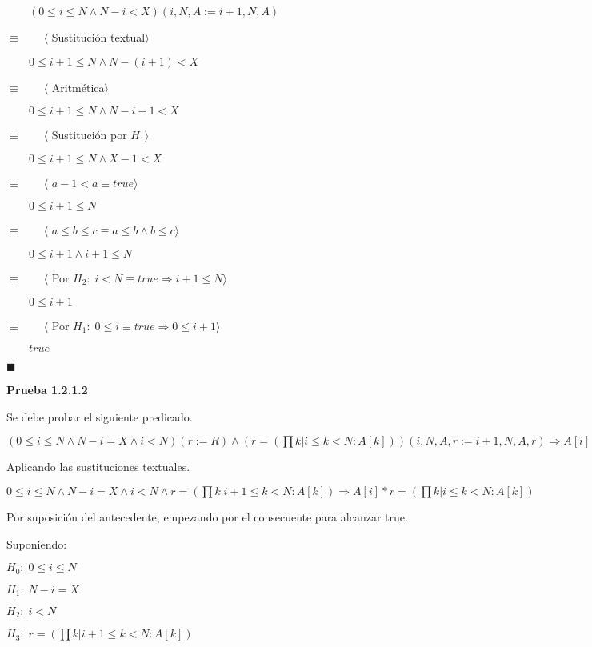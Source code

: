 \documentclass[hidelinks]{article}
\begin{document}
\begin{itemize}
	      $\qquad (0 \leq i \leq N \land N - i < X)(i,N, A := i + 1,N,A)$\par
	      $\equiv \qquad \langle$ Sustitución textual$\rangle$\par
	      $\qquad 0 \leq i + 1 \leq N \land N - (i + 1) < X$\par
	      $\equiv \qquad \langle$ Aritmética$\rangle$\par
	      $\qquad 0 \leq i + 1 \leq N \land N - i - 1 < X$\par
	      $\equiv \qquad \langle$ Sustitución por $H_1\rangle$\par
	      $\qquad 0 \leq i + 1 \leq N \land X - 1 < X$\par
	      $\equiv \qquad \langle$ $a - 1 < a \equiv true\rangle$\par
	      $\qquad 0 \leq i + 1 \leq N$\par
	      $\equiv \qquad \langle$ $a \leq b \leq c \equiv a \leq b \land b \leq c\rangle$\par
	      $\qquad 0 \leq i + 1 \land i + 1 \leq N$\par
	      $\equiv \qquad \langle$ Por $H_2: \; i < N \equiv true \Rightarrow i + 1 \leq N \rangle$\par
	      $\qquad 0 \leq i + 1$\par
	      $\equiv \qquad \langle$ Por $H_1: \; 0 \leq i \equiv true \Rightarrow 0 \leq i + 1 \rangle$\par
	      $\qquad true$\par
	      $\blacksquare$\par

	      \textbf{Prueba 1.2.1.2}\par
	      Se debe probar el siguiente predicado.\par
	      $(0 \leq i \leq N \land N - i = X \land i < N)(r := R) \land (r = (\prod k | i \leq k < N: A[k]))(i,N,A,r := i + 1, N,A,r) \Rightarrow A[i]*r = (\prod k | i \leq k < N: A[k])$\par
	      Aplicando las sustituciones textuales.\par
	      $0 \leq i \leq N \land N - i = X \land i < N \land r = (\prod k | i + 1 \leq k < N: A[k]) \Rightarrow A[i]*r = (\prod k | i \leq k < N: A[k])$\par

	      Por suposición del antecedente, empezando por el consecuente para alcanzar
	      true.\par

	      Suponiendo:\par
	      $H_0: \; 0 \leq i \leq N$\par
	      $H_1: \; N - i = X$\par
	      $H_2: \; i < N$\par
	      $H_3: \; r = (\prod k | i + 1 \leq k < N: A[k])$\par


\end{itemize}
\end{document}
